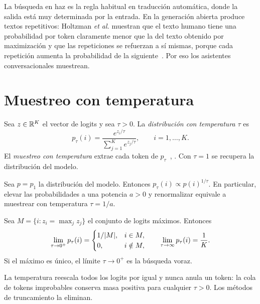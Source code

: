 \begin{observacion}[Degeneración]
La búsqueda en haz es la regla habitual en traducción automática, donde la salida está muy determinada por la entrada. En la generación abierta produce textos repetitivos: Holtzman \emph{et al.} muestran que el texto humano tiene una probabilidad por token claramente menor que la del texto obtenido por maximización y que las repeticiones se refuerzan a sí mismas, porque cada repetición aumenta la probabilidad de la siguiente~\cite[§4.3]{holtzman}. Por eso los asistentes conversacionales muestrean.
\end{observacion}

\section{Muestreo con temperatura}

\begin{definicion}\label{def:temperatura}
Sea $z\in\mathbb{R}^{K}$ el vector de logits y sea $\tau>0$. La \emph{distribución con temperatura} $\tau$ es
\[
p_\tau(i)=\frac{e^{z_i/\tau}}{\sum_{j=1}^{K}e^{z_j/\tau}},\qquad i=1,\dots,K.
\]
El \emph{muestreo con temperatura} extrae cada token de $p_\tau$~\cite[§7.6.3]{jm3}, \cite[§3.3]{holtzman}. Con $\tau=1$ se recupera la distribución del modelo.
\end{definicion}

\begin{proposicion}\label{prop:potencia}
Sea $p=p_1$ la distribución del modelo. Entonces $p_\tau(i)\propto p(i)^{1/\tau}$. En particular, elevar las probabilidades a una potencia $a>0$ y renormalizar equivale a muestrear con temperatura $\tau=1/a$.
\end{proposicion}

\begin{proposicion}\label{prop:limites-tau}
Sea $M=\{i:z_i=\max_j z_j\}$ el conjunto de logits máximos. Entonces
\[
\lim_{\tau\to 0^{+}}p_\tau(i)=\begin{cases}1/\lvert M\rvert, & i\in M,\\ 0,& i\notin M,\end{cases}
\qquad
\lim_{\tau\to\infty}p_\tau(i)=\frac{1}{K}.
\]
Si el máximo es único, el límite $\tau\to 0^{+}$ es la búsqueda voraz.
\end{proposicion}

\addtocounter{definicion}{1}%

La temperatura reescala todos los logits por igual y nunca anula un token: la cola de tokens improbables conserva masa positiva para cualquier $\tau>0$. Los métodos de truncamiento la eliminan.

